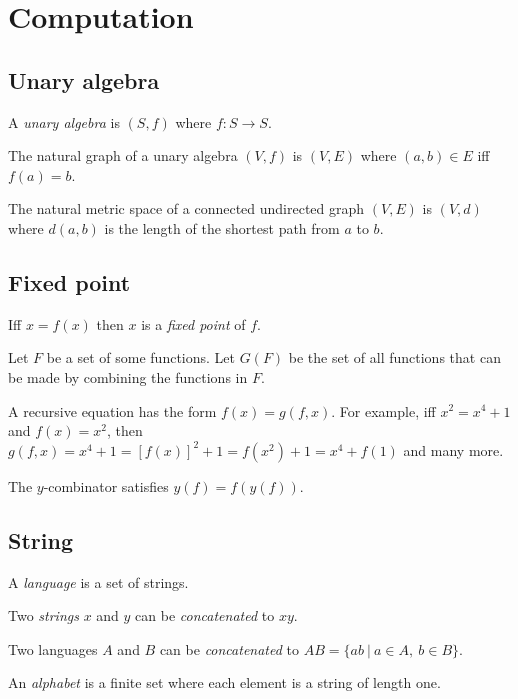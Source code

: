\chapter{Computation}

\section{Unary algebra}

%
A \emph{unary algebra} is \((S,f)\) where \(f : S \to S\).


The natural graph of a unary algebra \((V,f)\) is \((V,E)\)
where \((a,b) \in E\) iff \(f(a) = b\).

The natural metric space of a connected undirected graph \((V,E)\) is \((V,d)\) where
\(d(a,b)\) is the length of the shortest path from \(a\) to \(b\).

\section{Fixed point}

Iff \(x = f(x)\) then \(x\) is a \emph{fixed point} of \(f\).

Let \(F\) be a set of some functions.
Let \(G(F)\) be the set of all functions that can be made by combining the functions in \(F\).

A recursive equation has the form \(f(x) = g(f,x)\).
For example, iff \(x^2 = x^4 + 1\) and \(f(x) = x^2\), then \(g(f,x) = x^4 + 1 = [f(x)]^2 + 1 = f(x^2) + 1 = x^4 + f(1)\)
and many more.

The \(y\)-combinator satisfies \(y(f) = f(y(f))\).

\section{String}

%
A \emph{language} is a set of strings.

Two
%
\emph{strings}
\(x\) and \(y\) can be
%
%
\emph{concatenated} to \(xy\).

Two languages \(A\) and \(B\) can be
%
%
\emph{concatenated} to
\(AB = \{ ab ~|~ a \in A, ~ b \in B \}\).

%
An \emph{alphabet} is a finite set where each element is a string of length one.

